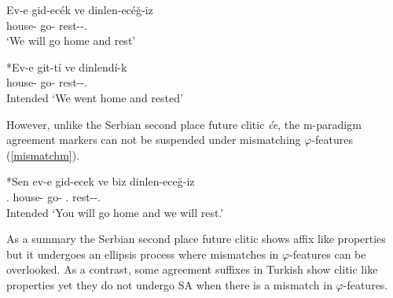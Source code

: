 \begin{exe}
    \ex \label{k-iz} 
    \begin{xlist}
        \ex \gll 
        Ev-e gid-ec\'{e}k ve dinlen-ec\'{e}ğ-iz \\ house-{\Dat} go-{\Fut} {\And} rest-{\Fut}-{\First}.{\Pl} \\
        \glt `We will go home and rest'
        
        \ex \gll 
        *Ev-e git-t\'i ve dinlend\'i-k \\ house-{\Dat} go-{\Pst} {\And} rest-{\Pst}-{\First}.{\Pl} \\
        \glt Intended `We went home and rested'
    \end{xlist}
\end{exe}

However, unlike the Serbian second place future clitic \textit{\'ce}, the m-paradigm agreement markers can not be suspended under mismatching $\varphi$-features (\ref{mismatchm}).

\begin{exe}
    \ex \label{mismatchm}
    \gll 
    *Sen ev-e gid-ecek ve biz dinlen-eceğ-iz \\ {\Second}.{\Sg} house-{\Dat} go-{\Fut} {\And} {\First}.{\Pl} rest-{\Fut}-{\First}.{\Pl} \\
    \glt Intended `You will go home and we will rest.'
\end{exe}

As a summary the Serbian second place future clitic shows affix like properties but it undergoes an ellipsis process where mismatches in $\varphi$-features can be overlooked. As a contrast, some agreement suffixes in Turkish show clitic like properties yet they do not undergo SA when there is a mismatch in $\varphi$-features.

















